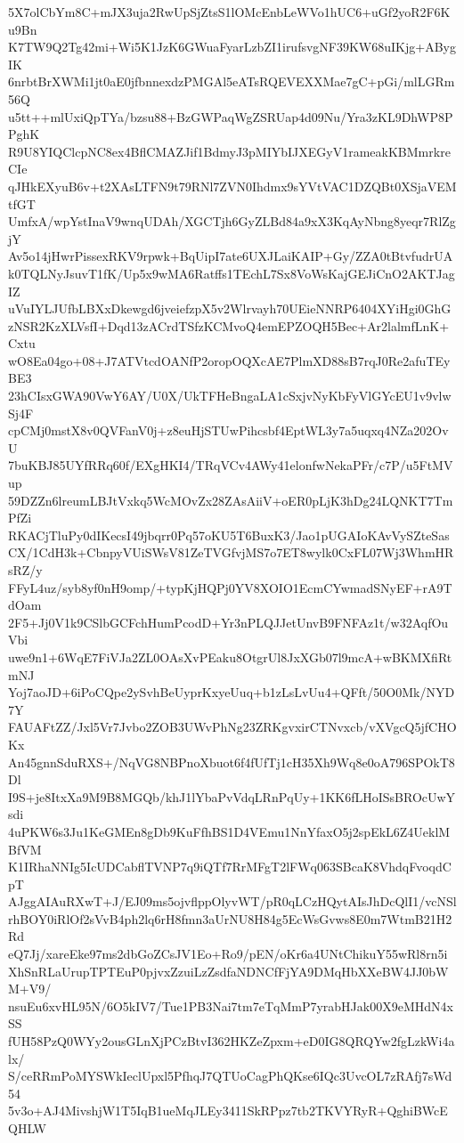 5X7olCbYm8C+mJX3uja2RwUpSjZtsS1lOMcEnbLeWVo1hUC6+uGf2yoR2F6Ku9Bn
K7TW9Q2Tg42mi+Wi5K1JzK6GWuaFyarLzbZI1irufsvgNF39KW68uIKjg+ABygIK
6nrbtBrXWMi1jt0aE0jfbnnexdzPMGAl5eATsRQEVEXXMae7gC+pGi/mlLGRm56Q
u5tt++mlUxiQpTYa/bzsu88+BzGWPaqWgZSRUap4d09Nu/Yra3zKL9DhWP8PPghK
R9U8YIQClcpNC8ex4BflCMAZJif1BdmyJ3pMIYbIJXEGyV1rameakKBMmrkreCIe
qJHkEXyuB6v+t2XAsLTFN9t79RNl7ZVN0Ihdmx9sYVtVAC1DZQBt0XSjaVEMtfGT
UmfxA/wpYstInaV9wnqUDAh/XGCTjh6GyZLBd84a9xX3KqAyNbng8yeqr7RlZgjY
Av5o14jHwrPissexRKV9rpwk+BqUipI7ate6UXJLaiKAIP+Gy/ZZA0tBtvfudrUA
k0TQLNyJsuvT1fK/Up5x9wMA6Ratffs1TEchL7Sx8VoWsKajGEJiCnO2AKTJagIZ
uVuIYLJUfbLBXxDkewgd6jveiefzpX5v2Wlrvayh70UEieNNRP6404XYiHgi0GhG
zNSR2KzXLVsfI+Dqd13zACrdTSfzKCMvoQ4emEPZOQH5Bec+Ar2lalmfLnK+Cxtu
wO8Ea04go+08+J7ATVtcdOANfP2oropOQXcAE7PlmXD88sB7rqJ0Re2afuTEyBE3
23hCIsxGWA90VwY6AY/U0X/UkTFHeBngaLA1cSxjvNyKbFyVlGYcEU1v9vlwSj4F
cpCMj0mstX8v0QVFanV0j+z8euHjSTUwPihcsbf4EptWL3y7a5uqxq4NZa202OvU
7buKBJ85UYfRRq60f/EXgHKI4/TRqVCv4AWy41elonfwNekaPFr/c7P/u5FtMVup
59DZZn6lreumLBJtVxkq5WcMOvZx28ZAsAiiV+oER0pLjK3hDg24LQNKT7TmPfZi
RKACjTluPy0dIKecsI49jbqrr0Pq57oKU5T6BuxK3/Jao1pUGAIoKAvVySZteSas
CX/1CdH3k+CbnpyVUiSWsV81ZeTVGfvjMS7o7ET8wylk0CxFL07Wj3WhmHRsRZ/y
FFyL4uz/syb8yf0nH9omp/+typKjHQPj0YV8XOIO1EcmCYwmadSNyEF+rA9TdOam
2F5+Jj0V1k9CSlbGCFchHumPcodD+Yr3nPLQJJetUnvB9FNFAz1t/w32AqfOuVbi
uwe9n1+6WqE7FiVJa2ZL0OAsXvPEaku8OtgrUl8JxXGb07l9mcA+wBKMXfiRtmNJ
Yoj7aoJD+6iPoCQpe2ySvhBeUyprKxyeUuq+b1zLsLvUu4+QFft/50O0Mk/NYD7Y
FAUAFtZZ/Jxl5Vr7Jvbo2ZOB3UWvPhNg23ZRKgvxirCTNvxcb/vXVgcQ5jfCHOKx
An45gnnSduRXS+/NqVG8NBPnoXbuot6f4fUfTj1cH35Xh9Wq8e0oA796SPOkT8Dl
I9S+je8ItxXa9M9B8MGQb/khJ1lYbaPvVdqLRnPqUy+1KK6fLHoISsBROcUwYsdi
4uPKW6s3Ju1KeGMEn8gDb9KuFfhBS1D4VEmu1NnYfaxO5j2spEkL6Z4UeklMBfVM
K1IRhaNNIg5IcUDCabflTVNP7q9iQTf7RrMFgT2lFWq063SBcaK8VhdqFvoqdCpT
AJggAIAuRXwT+J/EJ09ms5ojvflppOlyvWT/pR0qLCzHQytAIsJhDcQlI1/vcNSl
rhBOY0iRlOf2sVvB4ph2lq6rH8fmn3aUrNU8H84g5EcWsGvws8E0m7WtmB21H2Rd
eQ7Jj/xareEke97ms2dbGoZCsJV1Eo+Ro9/pEN/oKr6a4UNtChikuY55wRl8rn5i
XhSnRLaUrupTPTEuP0pjvxZzuiLzZsdfaNDNCfFjYA9DMqHbXXeBW4JJ0bWM+V9/
nsuEu6xvHL95N/6O5kIV7/Tue1PB3Nai7tm7eTqMmP7yrabHJak00X9eMHdN4xSS
fUH58PzQ0WYy2ousGLnXjPCzBtvI362HKZeZpxm+eD0IG8QRQYw2fgLzkWi4alx/
S/ceRRmPoMYSWkIeclUpxl5PfhqJ7QTUoCagPhQKse6IQc3UvcOL7zRAfj7sWd54
5v3o+AJ4MivshjW1T5IqB1ueMqJLEy3411SkRPpz7tb2TKVYRyR+QghiBWcEQHLW
